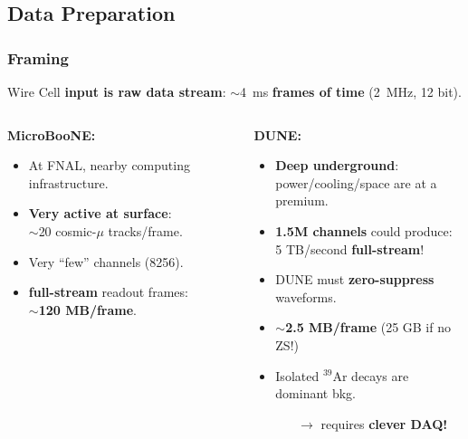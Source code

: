 \documentclass[xcolor=dvipsnames]{beamer}
\begin{document}
\subsection{Data Preparation}

\begin{frame}
  \frametitle{Framing}
  
  \vspace{-25mm}
  \begin{center}
  \end{center}

  \vspace{-10mm}

  \scriptsize
  Wire Cell \textbf{input is raw data stream}:  $\sim$\SI{4}{\milli\second} \textbf{frames of time} (\SI{2}{\mega\hertz}, 12 bit).

  \vspace{2mm}

  \begin{columns}
    \begin{column}{0.4\textwidth}
      \scriptsize
      \textbf{MicroBooNE:}
      \begin{itemize}
      \item At FNAL, nearby computing infrastructure.
      \item \textbf{Very active at surface}: \\
        $\sim$20 cosmic-$\mu$ tracks/frame.
      \item Very ``few'' channels (8256).
      \item \textbf{full-stream} readout frames:\\
        \textbf{$\sim$120 MB/frame}.
      \end{itemize}

    \end{column}
    \begin{column}{0.6\textwidth}
      \scriptsize
      
      \textbf{DUNE:}
      \begin{itemize}
      \item \textbf{Deep underground}:\\ power/cooling/space are at a premium.
      \item \textbf{1.5M channels} could produce: \\
        5 TB/second \textbf{full-stream}!
      \item DUNE must \textbf{zero-suppress} waveforms.
      \item \textbf{$\sim$2.5 MB/frame} (25 GB if no ZS!)
      \item Isolated $^{39}$Ar decays are dominant bkg.
        \begin{itemize}\scriptsize
        \item[$\rightarrow$] requires \textbf{clever DAQ!}
        \end{itemize}
      \end{itemize}

    \end{column}
  \end{columns}
\end{frame}
\end{document}
